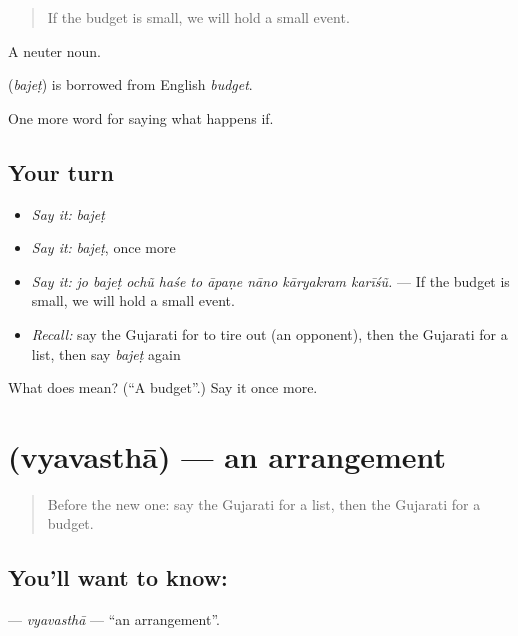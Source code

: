 \begin{quote}
If the budget is small, we will hold a small event.
\end{quote}

A neuter noun.

\begin{cousinweb}
\textbf{} (\emph{bajeṭ}) is borrowed from English \emph{budget}.
\end{cousinweb}

\begin{grammarlens}[title={What you've built}]
One more word for saying what happens if.
\end{grammarlens}

\subsection*{Your turn}
\begin{itemize}
\raggedright
  \item \emph{Say it:} \emph{bajeṭ}
  \item \emph{Say it:} \emph{bajeṭ}, once more
  \item \emph{Say it:} \emph{jo bajeṭ ochũ haśe to āpaṇe nāno kāryakram karīśũ.} — If the budget is small, we will hold a small event.
  \item \emph{Recall:} say the Gujarati for to tire out (an opponent), then the Gujarati for a list, then say \emph{bajeṭ} again
\end{itemize}

\begin{tcolorbox}[breakable,colback=teal!4,colframe=teal!35!black,title={Before you move on}]
What does  mean? (\textquotedblleft{}A budget\textquotedblright{}.) Say it once more.
\end{tcolorbox}
\section[\texorpdfstring{\gu{વ્યવસ્થા} (vyavasthā)}{વ્યવસ્થા (vyavasthā)}]{ (vyavasthā) — an arrangement}

\label{lesson:GU-C528-vyavastha}



\begin{quote}
Before the new one: say the Gujarati for a list, then the Gujarati for a budget.
\end{quote}

\subsection*{You'll want to know: }
\textbf{} — \emph{vyavasthā} — \textquotedblleft{}an arrangement\textquotedblright{}.

